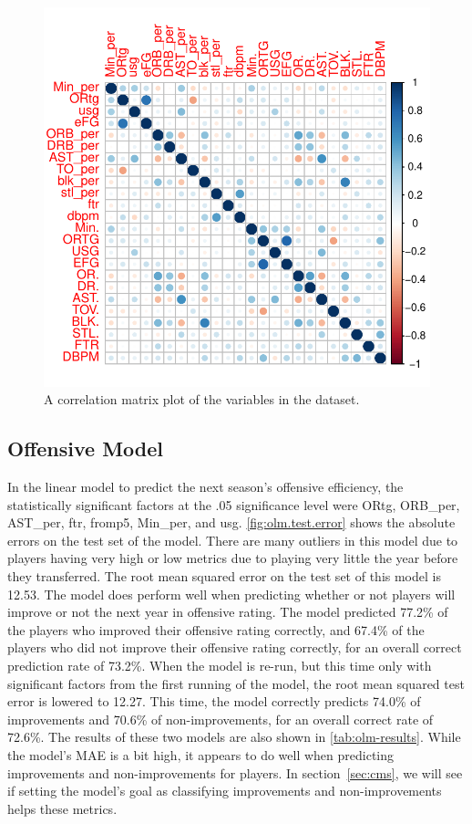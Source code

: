 \documentclass[12pt]{article}
\begin{document}
\begin{figure}[tbp]
	\centering
	\includegraphics[width=\textwidth]{corrplot}
	\caption{A correlation matrix plot of the variables in the dataset.}
	\label{fig:corrplot}
\end{figure}

\subsection{Offensive Model}
\label{subsec:olm}
In the linear model to predict the next season's offensive efficiency, the statistically significant factors at the .05 significance level were ORtg, ORB\_per, AST\_per, ftr, fromp5, Min_per, and usg. \autoref{fig:olm.test.error} shows the absolute errors on the test set of the model. There are many outliers in this model due to players having very high or low metrics due to playing very little the year before they transferred. The root mean squared error on the test set of this model is 12.53. The model does perform well when predicting whether or not players will improve or not the next year in offensive rating. The model predicted 77.2\% of the players who improved their offensive rating correctly, and 67.4\% of the players who did not improve their offensive rating correctly, for an overall correct prediction rate of 73.2\%. When the model is re-run, but this time only with significant factors from the first running of the model, the root mean squared test error is lowered to 12.27. This time, the model correctly predicts 74.0\% of improvements and 70.6\% of non-improvements, for an overall correct rate of 72.6\%. The results of these two models are also shown in \autoref{tab:olm-results}. While the model's MAE is a bit high, it appears to do well when predicting improvements and non-improvements for players. In section~\ref{sec:cms}, we will see if setting the model's goal as classifying improvements and non-improvements helps these metrics.
\end{document}
